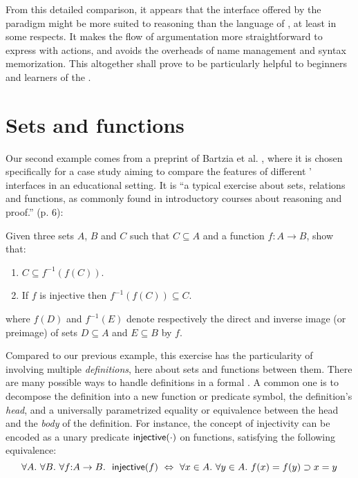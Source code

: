 From this detailed comparison, it appears that the interface offered by the
 paradigm might be more suited to  reasoning than the
 language of , at least in some respects. It makes the flow of
argumentation more straightforward to express with  actions, and avoids the
overheads of name management and syntax memorization. This altogether shall
prove to be particularly helpful to beginners and learners of the .


\section{Sets and functions}

Our second example comes from a preprint of Bartzia et al.
\cite{bartzia:hal-04087080}, where it is chosen specifically for a case study
aiming to compare the features of different ' interfaces in an
educational setting. It is ``a typical exercise about sets, relations and
functions, as commonly found in introductory courses about reasoning and
proof.'' (p. 6):

\begin{exercise}
  Given three sets $A$, $B$ and $C$ such that $C \subseteq A$ and a function $f
  : A \to B$, show that:
  \begin{enumerate}
    \item $C \subseteq f^{-1}(f(C))$.
    \item If $f$ is injective then $f^{-1}(f(C)) \subseteq C$.
  \end{enumerate}
  where $f(D)$ and $f^{-1}(E)$ denote respectively the direct and inverse image
  (or preimage) of sets $D \subseteq A$ and $E \subseteq B$ by $f$.
\end{exercise}

Compared to our previous example, this exercise has the particularity of
involving multiple \emph{definitions}, here about sets and functions between
them. There are many possible ways to handle definitions in a formal . A common one is to decompose the definition into a new function or
predicate symbol, the definition's \emph{head}, and a universally parametrized
equality or equivalence between the head and the \emph{body} of the definition.
For instance, the concept of injectivity can be encoded as a unary predicate
$\mbox{\textsf{injective}}(\cdot)$ on functions, satisfying the following equivalence:
$$\forall A.\ \forall B.\ \forall f{:}A \to B.~\ \injective(f) ~\lequiv~ \forall x
\in A.\ \forall y \in A.\ f(x) = f(y) \limp x = y$$

